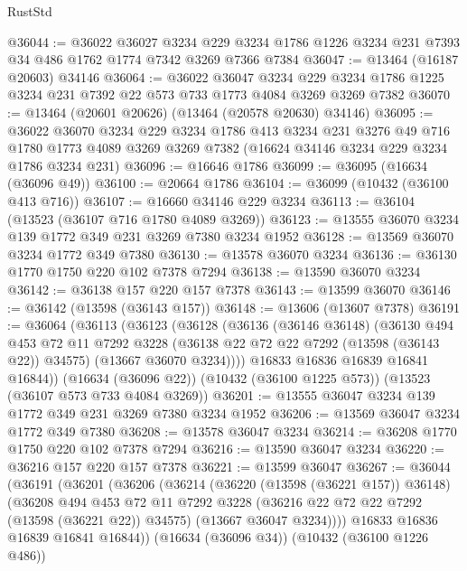 \begin{lexlean}{RustStd}
\begin{coremodule}
@36044 := @36022
    @36027
    @3234
    @229
    @3234
    @1786
    @1226
    @3234
    @231
    @7393
    @34
    @486
    @1762
    @1774
    @7342
    @3269
    @7366
    @7384
@36047 := @13464 (@16187 @20603) @34146
@36064 := @36022
    @36047
    @3234
    @229
    @3234
    @1786
    @1225
    @3234
    @231
    @7392
    @22
    @573
    @733
    @1773
    @4084
    @3269
    @3269
    @7382
@36070 := @13464 (@20601 @20626) (@13464 (@20578 @20630) @34146)
@36095 := @36022
    @36070
    @3234
    @229
    @3234
    @1786
    @413
    @3234
    @231
    @3276
    @49
    @716
    @1780
    @1773
    @4089
    @3269
    @3269
    @7382
    (@16624 @34146 @3234 @229 @3234 @1786 @3234 @231)
@36096 := @16646 @1786
@36099 := @36095 (@16634 (@36096 @49))
@36100 := @20664 @1786
@36104 := @36099 (@10432 (@36100 @413 @716))
@36107 := @16660 @34146 @229 @3234
@36113 := @36104 (@13523 (@36107 @716 @1780 @4089 @3269))
@36123 := @13555 @36070 @3234 @139 @1772 @349 @231 @3269 @7380 @3234 @1952
@36128 := @13569 @36070 @3234 @1772 @349 @7380
@36130 := @13578 @36070 @3234
@36136 := @36130 @1770 @1750 @220 @102 @7378 @7294
@36138 := @13590 @36070 @3234
@36142 := @36138 @157 @220 @157 @7378
@36143 := @13599 @36070
@36146 := @36142 (@13598 (@36143 @157))
@36148 := @13606 (@13607 @7378)
@36191 := @36064
    (@36113
      (@36123
        (@36128
          (@36136
            (@36146 @36148)
            (@36130
              @494
              @453
              @72
              @11
              @7292
              @3228
              (@36138 @22 @72 @22 @7292 (@13598 (@36143 @22)) @34575)
              (@13667 @36070 @3234))))
        @16833
        @16836
        @16839
        @16841
        @16844))
    (@16634 (@36096 @22))
    (@10432 (@36100 @1225 @573))
    (@13523 (@36107 @573 @733 @4084 @3269))
@36201 := @13555 @36047 @3234 @139 @1772 @349 @231 @3269 @7380 @3234 @1952
@36206 := @13569 @36047 @3234 @1772 @349 @7380
@36208 := @13578 @36047 @3234
@36214 := @36208 @1770 @1750 @220 @102 @7378 @7294
@36216 := @13590 @36047 @3234
@36220 := @36216 @157 @220 @157 @7378
@36221 := @13599 @36047
@36267 := @36044
    (@36191
      (@36201
        (@36206
          (@36214
            (@36220 (@13598 (@36221 @157)) @36148)
            (@36208
              @494
              @453
              @72
              @11
              @7292
              @3228
              (@36216 @22 @72 @22 @7292 (@13598 (@36221 @22)) @34575)
              (@13667 @36047 @3234))))
        @16833
        @16836
        @16839
        @16841
        @16844))
    (@16634 (@36096 @34))
    (@10432 (@36100 @1226 @486))

\end{coremodule}
\end{lexlean}
